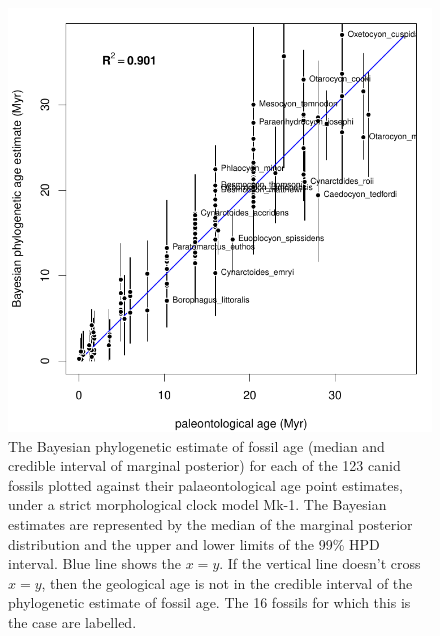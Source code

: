 \documentclass[11pt]{article}
\newcommand{\Mstrict}{{Mk-1}}
\begin{document}
\begin{figure}
\includegraphics{canids/1c_phyloAgeVsGeoAge.pdf}
\caption{\label{fig:canidMorphVsGeo}
The Bayesian phylogenetic estimate of fossil age (median and credible interval of marginal posterior) for each of the 123 canid fossils plotted against their palaeontological age point estimates, under a strict morphological clock model \Mstrict{}. 
The Bayesian estimates are represented by the median of the marginal posterior distribution and the upper and lower limits of the 99\% HPD interval. Blue line shows the $x=y$. 
If the vertical line doesn't cross $x=y$, then the geological age is not in the credible interval of the phylogenetic estimate of fossil age. The 16 fossils for which this is the case are labelled.}
\end{figure}
\end{document}
